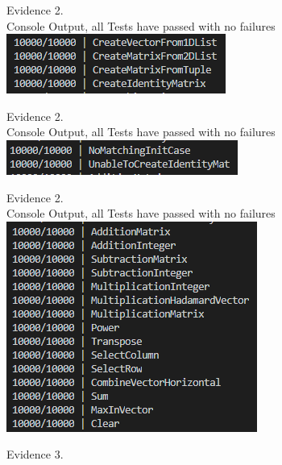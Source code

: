 \begin{flushleft}
\begin{center}
        {\large Evidence 2.\rn } \\ 
        \vspace{0.3cm}
        Console Output, all Tests have passed with no failures \\
        \includegraphics[4cm]{Images/Testing/T2.20.1.PNG} \\
        \vspace{1cm}

        {\large Evidence 2.\rn } \\ 
        \vspace{0.3cm}
        Console Output, all Tests have passed with no failures \\
        \includegraphics[4cm]{Images/Testing/T2.21.1.PNG} \\
        \vspace{1cm}

        {\large Evidence 2.\rn } \\ 
        \vspace{0.3cm}
        Console Output, all Tests have passed with no failures \\
        \includegraphics[4cm]{Images/Testing/T2.22.1.PNG} \\
        \vspace{1cm}
    \end{center}

    \setcounter{magicrownumbers}{0}
    \begin{center}
        {\large Evidence 3.\rn } \\ 
        \vspace{0.3cm}
    \end{center}


\end{flushleft}
